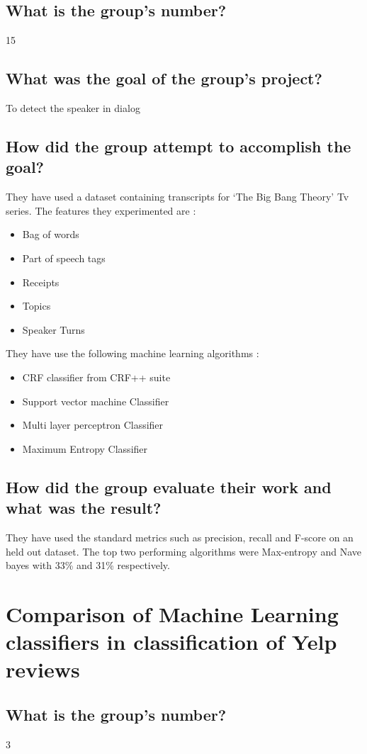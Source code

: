 \documentclass[letterpaper]{article}
\begin{document}
\subsection{What is the group's number?}
15
\subsection{What was the goal of the group's project?}
To detect the speaker in dialog
\subsection{How did the group attempt to accomplish the goal?}
They have used a dataset containing transcripts for `The Big Bang Theory' Tv series.
The features they experimented are :
\begin{itemize}
	\item Bag of words 
	\item Part of speech tags
	\item Receipts
	\item Topics
	\item Speaker Turns
\end{itemize}
They have use the following machine learning algorithms :
\begin{itemize}
	\item CRF classifier from CRF++ suite
	\item Support vector machine Classifier
	\item Multi layer perceptron Classifier
	\item Maximum Entropy Classifier
\end{itemize}
\subsection{How did the group evaluate their work and what was the result?}
They have used the standard metrics such as precision, recall and F-score on an held out dataset.
The top two performing algorithms were Max-entropy and Nave bayes with 33\% and 31\% respectively.

\section{Comparison of Machine Learning classifiers in classification of Yelp reviews}
\subsection{What is the group's number?}
3
\end{document}
